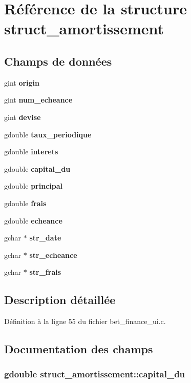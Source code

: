 \section{Référence de la structure struct\_\-amortissement}
\label{structstruct__amortissement}
\subsection*{Champs de données}
\begin{DoxyCompactItemize}
\item 
gint {\bf origin}
\item 
gint {\bf num\_\-echeance}
\item 
gint {\bf devise}
\item 
gdouble {\bf taux\_\-periodique}
\item 
gdouble {\bf interets}
\item 
gdouble {\bf capital\_\-du}
\item 
gdouble {\bf principal}
\item 
gdouble {\bf frais}
\item 
gdouble {\bf echeance}
\item 
gchar $\ast$ {\bf str\_\-date}
\item 
gchar $\ast$ {\bf str\_\-echeance}
\item 
gchar $\ast$ {\bf str\_\-frais}
\end{DoxyCompactItemize}


\subsection{Description détaillée}


Définition à la ligne 55 du fichier bet\_\-finance\_\-ui.c.



\subsection{Documentation des champs}
\subsubsection[{capital\_\-du}]{\setlength{\rightskip}{0pt plus 5cm}gdouble {\bf struct\_\-amortissement::capital\_\-du}}\label{structstruct__amortissement_a684a0dfd04492599aea4dbf463fccf64}


